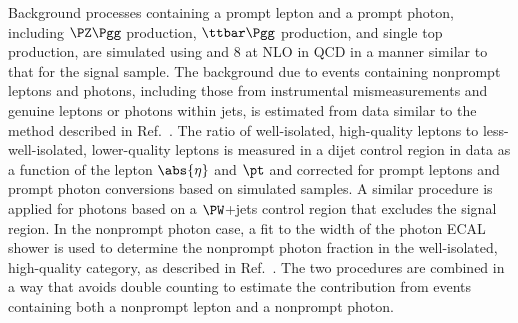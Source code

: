 Background processes containing a prompt lepton and a prompt photon, including $\PZ\Pgg$ production, $\ttbar\Pgg$ production, and single top production, are simulated using \MGvATNLO and {\PYTHIA}8 at NLO in QCD in a manner similar to that for the signal sample. The background due to events containing nonprompt leptons and photons, including those from instrumental mismeasurements and genuine leptons or photons within jets, is estimated from data similar to the method described in Ref.~\cite{CMS:2021foa}. The ratio of well-isolated, high-quality leptons to less-well-isolated, lower-quality leptons is measured in a dijet control region in data as a function of the lepton $\abs{\eta}$ and $\pt$ and corrected for prompt leptons and prompt photon conversions based on simulated samples. A similar procedure is applied for photons based on a $\PW$+jets control region that excludes the signal region. In the nonprompt photon case, a fit to the width of the photon ECAL shower is used to determine the nonprompt photon fraction in the well-isolated, high-quality category, as described in Ref.~\cite{Sirunyan_2020}. The two procedures are combined in a way that avoids double counting to estimate the contribution from events containing both a nonprompt lepton and a nonprompt photon. 

